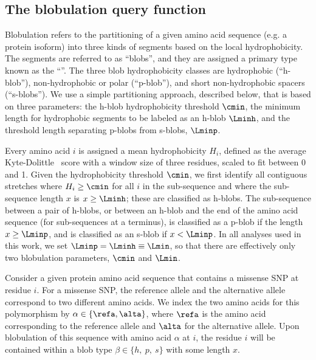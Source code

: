 \subsection*{The blobulation query function}
Blobulation refers to the partitioning of a given amino acid sequence (e.g. a protein isoform) into three kinds of segments based on the local hydrophobicity. The segments are referred to as ``blobs'', and they are assigned a primary type known as the ``\hydrochar''. The three blob hydrophobicity classes are hydrophobic (``h-blob''), non-hydrophobic or polar (``p-blob''), and short non-hydrophobic spacers (``s-blobs''). We use a simple partitioning approach, described below, that is based on three parameters: the h-blob hydrophobicity threshold $\cmin$, the minimum length for hydrophobic segments to be labeled as an h-blob $\Lminh$, and the threshold length separating p-blobs from s-blobs, $\Lminp$.

Every amino acid $i$ is assigned a mean hydrophobicity $H_i$, defined as the average Kyte-Dolittle~\citep{Kyte1982} score with a window size of three residues, scaled to fit between 0 and 1. Given the hydrophobicity threshold $\cmin$, we first identify all contiguous stretches where $H_i \geq \cmin$ for all $i$ in the sub-sequence and where the sub-sequence length $x$ is $x\geq \Lminh$; these are classified as h-blobs. The sub-sequence between a pair of h-blobs, or between an h-blob and the end of the amino acid sequence (for sub-sequences at a terminus), is classified as a p-blob if the length $x\geq \Lminp$, and is classified as an s-blob if $x<\Lminp$. In all analyses used in this work, we set $\Lminp=\Lminh\equiv \Lmin$, so that there are effectively only two blobulation parameters, $\cmin$ and $\Lmin$.

Consider a given protein amino acid sequence that contains a missense SNP at residue $i$. For a missense SNP, the reference allele and the alternative allele correspond to two different amino acids. We index the two amino acids for this polymorphism by $\alpha\in \{ \refa ,\alta \}$, where $\refa$ is the amino acid corresponding to the reference allele and $\alta$ for the alternative allele. Upon blobulation of this sequence with amino acid $\alpha$ at $i$, the residue $i$ will be contained within a blob type $\beta \in \{h, \ p, \ s\}$ with some length $x$.

